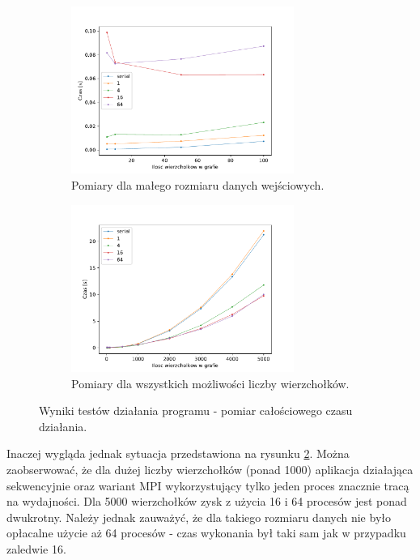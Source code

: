 \documentclass[12pt]{article}
\begin{document}
\begin{figure}[H]
\centering

\begin{subfigure}{\textwidth}
\centering
\includegraphics[width=0.8\textwidth]{static/total_times_begin.pdf}
\caption{Pomiary dla małego rozmiaru danych wejściowych.}
\label{fig:testall1}
\end{subfigure}

\begin{subfigure}{\textwidth}
\centering
\includegraphics[width=0.8\textwidth]{static/total_times.pdf} 
\caption{Pomiary dla wszystkich możliwości liczby wierzchołków.}
\label{fig:testall2}
\end{subfigure}

\caption{Wyniki testów działania programu - pomiar całościowego czasu działania.}
\label{fig:testall}
\end{figure}

Inaczej wygląda jednak sytuacja przedstawiona na rysunku \ref{fig:testall2}. Można zaobserwować, że dla dużej liczby wierzchołków (ponad 1000) aplikacja działająca sekwencyjnie oraz wariant MPI wykorzystujący tylko jeden proces znacznie tracą na wydajności. Dla 5000 wierzchołków zysk z użycia 16 i 64 procesów jest ponad dwukrotny. Należy jednak zauważyć, że dla takiego rozmiaru danych nie było opłacalne użycie aż 64 procesów - czas wykonania był taki sam jak w przypadku zaledwie 16.
\end{document}
